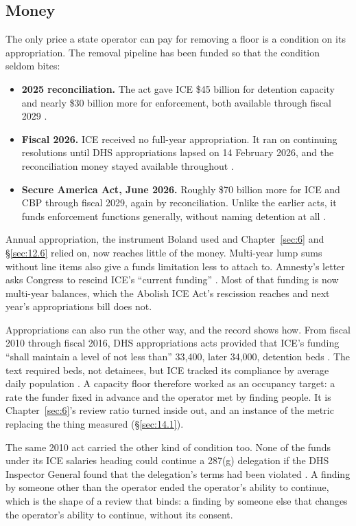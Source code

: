 \subsection{Money}
\label{sec:10.4.3}
The only price a state operator can pay for removing a floor is a condition on its appropriation. The removal pipeline has been funded so that the condition seldom bites:

\begin{itemize}
\item \textbf{2025 reconciliation.} The act gave ICE \$45 billion for detention capacity and nearly \$30 billion more for enforcement, both available through fiscal 2029 \autocite{obbba2025}.
\item \textbf{Fiscal 2026.} ICE received no full-year appropriation. It ran on continuing resolutions until DHS appropriations lapsed on 14 February 2026, and the reconciliation money stayed available throughout \autocite{gao2026detention}.
\item \textbf{Secure America Act, June 2026.} Roughly \$70 billion more for ICE and CBP through fiscal 2029, again by reconciliation. Unlike the earlier acts, it funds enforcement functions generally, without naming detention at all \autocite{secureamerica2026,gao2026detention}.
\end{itemize}

Annual appropriation, the instrument Boland used and Chapter~\ref{sec:6} and \S\ref{sec:12.6} relied on, now reaches little of the money. Multi-year lump sums without line items also give a funds limitation less to attach to. Amnesty's letter asks Congress to rescind ICE's “current funding” \autocite{AmnestyUSA2026Letter}. Most of that funding is now multi-year balances, which the Abolish ICE Act's rescission reaches and next year's appropriations bill does not.

Appropriations can also run the other way, and the record shows how. From fiscal 2010 through fiscal 2016, DHS appropriations acts provided that ICE's funding “shall maintain a level of not less than” 33,400, later 34,000, detention beds \autocite{dhsapprop2010,Geng2018BedQuota}. The text required beds, not detainees, but ICE tracked its compliance by average daily population \autocite{Geng2018BedQuota}. A capacity floor therefore worked as an occupancy target: a rate the funder fixed in advance and the operator met by finding people. It is Chapter~\ref{sec:6}'s review ratio turned inside out, and an instance of the metric replacing the thing measured (\S\ref{sec:14.1}).

The same 2010 act carried the other kind of condition too. None of the funds under its ICE salaries heading could continue a 287(g) delegation if the DHS Inspector General found that the delegation's terms had been violated \autocite{dhsapprop2010}. A finding by someone other than the operator ended the operator's ability to continue, which is the shape of a review that binds: a finding by someone else that changes the operator's ability to continue, without its consent.
